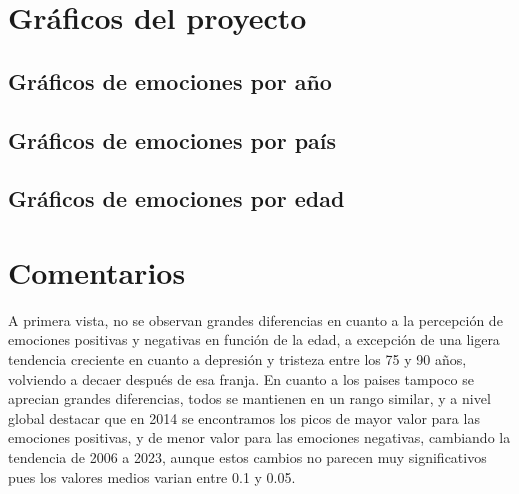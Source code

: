 \documentclass{article}
\begin{document}
\section{Gráficos del proyecto}
\subsection{Gráficos de emociones por año}








\subsection{Gráficos de emociones por país}











\subsection{Gráficos de emociones por edad}






\section*{Comentarios}
A primera vista, no se observan grandes diferencias en cuanto a la percepción de emociones positivas y negativas en función de la edad, a excepción de una ligera tendencia creciente en cuanto a depresión y tristeza entre los 75 y 90 años, volviendo a decaer después de esa franja. En cuanto a los paises tampoco se aprecian grandes diferencias, todos se mantienen en un rango similar, y a nivel global destacar que en 2014 se encontramos los picos de mayor valor para las emociones positivas, y de menor valor para las emociones negativas, cambiando la tendencia de 2006 a 2023, aunque estos cambios no parecen muy significativos pues los valores medios varian entre 0.1 y 0.05.
\end{document}
